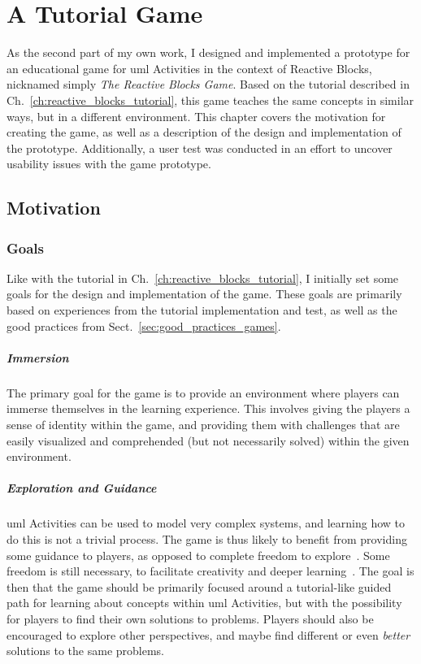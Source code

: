 \chapter{A Tutorial Game}
\label{ch:tutorial_game}
As the second part of my own work, I designed and implemented a prototype for an educational game for \gls{uml} Activities in the context of Reactive Blocks, nicknamed simply \emph{The Reactive Blocks Game}. Based on the tutorial described in Ch.~\ref{ch:reactive_blocks_tutorial}, this game teaches the same concepts in similar ways, but in a different environment. This chapter covers the motivation for creating the game, as well as a description of the design and implementation of the prototype. Additionally, a user test was conducted in an effort to uncover usability issues with the game prototype.

\section{Motivation}
\label{sec:game_motivation}

\subsection{Goals}
\label{sec:game_goals}
Like with the tutorial in Ch.~\ref{ch:reactive_blocks_tutorial}, I initially set some goals for the design and implementation of the game. These goals are primarily based on experiences from the tutorial implementation and test, as well as the good practices from Sect.~\ref{sec:good_practices_games}.

\paragraph{Immersion} The primary goal for the game is to provide an environment where players can immerse themselves in the learning experience. This involves giving the players a sense of identity within the game, and providing them with challenges that are easily visualized and comprehended (but not necessarily solved) within the given environment.

\paragraph{Exploration and Guidance} \gls{uml} Activities can be used to model very complex systems, and learning how to do this is not a trivial process. The game is thus likely to benefit from providing some guidance to players, as opposed to complete freedom to explore~\cite{andersen:tutorials_impact}. Some freedom is still necessary, to facilitate creativity and deeper learning~\cite{bonawitz:double_edged_pedagogy}. The goal is then that the game should be primarily focused around a tutorial-like guided path for learning about concepts within \gls{uml} Activities, but with the possibility for players to find their own solutions to problems. Players should also be encouraged to explore other perspectives, and maybe find different or even \emph{better} solutions to the same problems.

